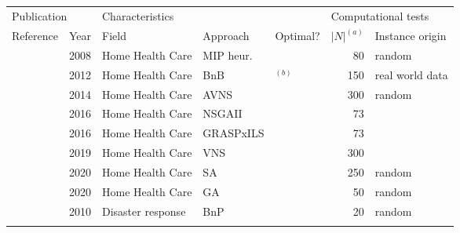 \begin{table}[t]
	\tableConfig
	\begin{tabular*}{\textwidth}{@{\extracolsep{\fill}}lllllrl}
		\toprule
		\multicolumn{2}{l}{Publication} 									&
		\multicolumn{3}{l}{Characteristics} 									&
		\multicolumn{2}{l}{Computational tests} 								\\
		\cmidrule(rl){1-2} \cmidrule(rl){3-5} \cmidrule(rl){6-7}
		\multicolumn{1}{l}{Reference} 										&
		\multicolumn{1}{l}{Year} 										&
		\multicolumn{1}{l}{Field} 										&
		\multicolumn{1}{l}{Approach} 										&
		\multicolumn{1}{l}{Optimal?} 										&
		\multicolumn{1}{l}{$|N|^{(a)}$} 									&
		\multicolumn{1}{l}{Instance origin} 									\\
		\midrule %
		\cite{bredstromCombinedVehicleRouting2008a} & 
			2008 & 
			Home Health Care & 
			MIP heur. &  
				& 
			80 & 
			random \\
		\cite{rasmussenHomeCareCrew2012} & 
			2012 & 
			Home Health Care & 
			BnB & 
			\yes$^{(b)}$ & 
			150 & 
			real world data \\
		\cite{mankowskaHomeHealthCare2014} & 
			2014 & 
			Home Health Care & 
			AVNS & 
				& 
			300 & 
			random \\
		\cite{haddadeneNSGAIIEnhancedLocal2016} & 
			2016 & 
			Home Health Care & 
			NSGAII & 
			 & 
			73 & 
			\cite{bredstromCombinedVehicleRouting2008a} \\
		\cite{aithaddadeneGRASPILSVehicle2016} & 
			2016 & 
			Home Health Care & 
			GRASPxILS & 
			 & 
			73 & 
			\cite{bredstromCombinedVehicleRouting2008a} \\
		\cite{lasfargeasSolvingHomeHealth2019} & 
			2019 & 
			Home Health Care & 
			VNS &  
			 & 
			300 & 
			\cite{mankowskaHomeHealthCare2014} \\
		\cite{manavizadehUsingMetaheuristicAlgorithm2020} & 
			2020 & 
			Home Health Care & 
			SA &  
			 & 
			250 & 
			random \\
		\cite{entezariDevelopingMathematicalModel2020} & 
			2020 & 
			Home Health Care & 
			GA &  
			 & 
			50 & 
			random \\
		\cite{korsahOptimalVehicleRouting2010} & 
			2010 & 
			Disaster response & 
			BnP & 
			\yes & 
			20 & 
			random \\
		\cite{taoMetaheuristicAlgorithmTransporter2019} & 

\end{tabular*}
\end{table}
